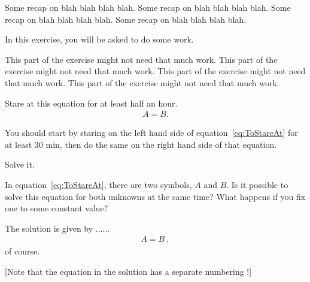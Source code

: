 \documentclass[11pt,a4paper]{article}
\begin{document}
\MakeUebungHeader


\begin{tips}
Some recap on blah blah blah blah.
Some recap on blah blah blah blah.
Some recap on blah blah blah blah.
Some recap on blah blah blah blah.
\end{tips}



In this exercise, you will be asked to do some work.

\begin{tips}
This part of the exercise might not need that much work.
This part of the exercise might not need that much work.
This part of the exercise might not need that much work.
This part of the exercise might not need that much work.
\end{tips}



\begin{exenumerate}
\item Stare at this equation for at least half an hour.
  \begin{align}
    \label{eq:ToStareAt}
    A = B.
  \end{align}

  \begin{tips}
    You should start by staring on the left hand side of equation~\eqref{eq:ToStareAt} for
    at least 30 min, then do the same on the right hand side of that equation.
  \end{tips}
  
\item Solve it.

  \begin{tips}
    In equation~\eqref{eq:ToStareAt}, there are two symbols, $A$ and $B$. Is it possible
    to solve this equation for both unknowns at the same time? What happens if you fix one
    to some constant value?
  \end{tips}

  \begin{loesung}%
    The solution is given by ...... 
    \begin{align}
      A=B\ ,
    \end{align}
    of course.

    [Note that the equation in the solution has a separate numbering !]
  \end{loesung}
\end{exenumerate}
\end{document}
